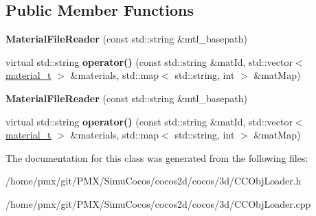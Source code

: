 \subsection*{Public Member Functions}
\begin{DoxyCompactItemize}
\item 
\mbox{\label{classtinyobj_1_1MaterialFileReader_a824d0100284310fe213d86ad443cc575}} 
{\bfseries Material\+File\+Reader} (const std\+::string \&mtl\+\_\+basepath)
\item 
\mbox{\label{classtinyobj_1_1MaterialFileReader_a9374212c9997aa8ac0d15d97f67b25f8}} 
virtual std\+::string {\bfseries operator()} (const std\+::string \&mat\+Id, std\+::vector$<$ \hyperlink{structtinyobj_1_1material__t}{material\+\_\+t} $>$ \&materials, std\+::map$<$ std\+::string, int $>$ \&mat\+Map)
\item 
\mbox{\label{classtinyobj_1_1MaterialFileReader_a824d0100284310fe213d86ad443cc575}} 
{\bfseries Material\+File\+Reader} (const std\+::string \&mtl\+\_\+basepath)
\item 
\mbox{\label{classtinyobj_1_1MaterialFileReader_ac663a6165a4c611e77f30a95723e7f74}} 
virtual std\+::string {\bfseries operator()} (const std\+::string \&mat\+Id, std\+::vector$<$ \hyperlink{structtinyobj_1_1material__t}{material\+\_\+t} $>$ \&materials, std\+::map$<$ std\+::string, int $>$ \&mat\+Map)
\end{DoxyCompactItemize}


The documentation for this class was generated from the following files\+:\begin{DoxyCompactItemize}
\item 
/home/pmx/git/\+P\+M\+X/\+Simu\+Cocos/cocos2d/cocos/3d/C\+C\+Obj\+Loader.\+h\item 
/home/pmx/git/\+P\+M\+X/\+Simu\+Cocos/cocos2d/cocos/3d/C\+C\+Obj\+Loader.\+cpp\end{DoxyCompactItemize}
